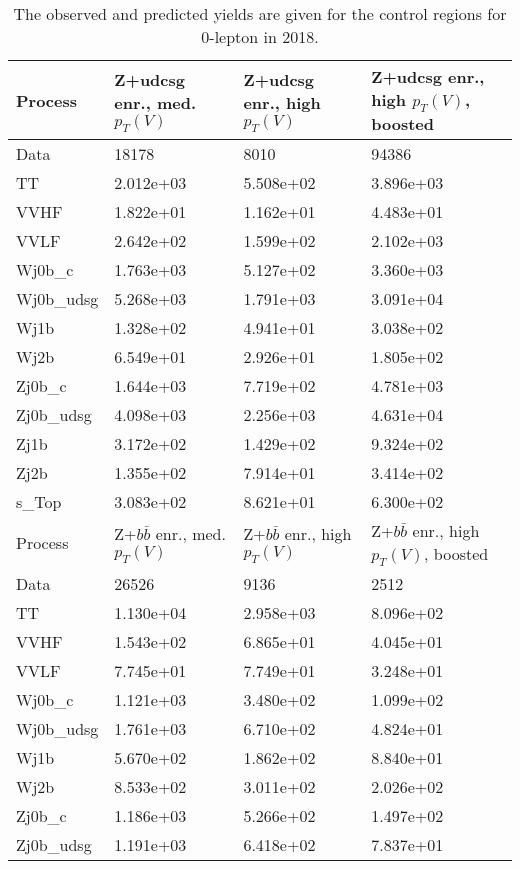 \begin{table}
\centering
\caption[2018 0-lepton control region yields]{
                  The observed and predicted yields are given for the
                  control regions for 0-lepton in 2018.
                  }
{\footnotesize
\begin{tabularx}{0.8\textwidth}{|X|X|X|X|}
\hline
Process & Z+udcsg enr., med. $p_{T}(V)$ & Z+udcsg enr., high $p_{T}(V)$ & Z+udcsg enr., high $p_{T}(V)$, boosted \\
\hline
Data & 18178 & 8010 & 94386 \\
\hline
TT & 2.012e+03 & 5.508e+02 & 3.896e+03 \\
VVHF & 1.822e+01 & 1.162e+01 & 4.483e+01 \\
VVLF & 2.642e+02 & 1.599e+02 & 2.102e+03 \\
Wj0b\_c & 1.763e+03 & 5.127e+02 & 3.360e+03 \\
Wj0b\_udsg & 5.268e+03 & 1.791e+03 & 3.091e+04 \\
Wj1b & 1.328e+02 & 4.941e+01 & 3.038e+02 \\
Wj2b & 6.549e+01 & 2.926e+01 & 1.805e+02 \\
Zj0b\_c & 1.644e+03 & 7.719e+02 & 4.781e+03 \\
Zj0b\_udsg & 4.098e+03 & 2.256e+03 & 4.631e+04 \\
Zj1b & 3.172e+02 & 1.429e+02 & 9.324e+02 \\
Zj2b & 1.355e+02 & 7.914e+01 & 3.414e+02 \\
s\_Top & 3.083e+02 & 8.621e+01 & 6.300e+02 \\
\hline
\hline
Process & Z+$b\bar{b}$ enr., med. $p_{T}(V)$ & Z+$b\bar{b}$ enr., high $p_{T}(V)$ & Z+$b\bar{b}$ enr., high $p_{T}(V)$, boosted \\
\hline
Data & 26526 & 9136 & 2512 \\
\hline
TT & 1.130e+04 & 2.958e+03 & 8.096e+02 \\
VVHF & 1.543e+02 & 6.865e+01 & 4.045e+01 \\
VVLF & 7.745e+01 & 7.749e+01 & 3.248e+01 \\
Wj0b\_c & 1.121e+03 & 3.480e+02 & 1.099e+02 \\
Wj0b\_udsg & 1.761e+03 & 6.710e+02 & 4.824e+01 \\
Wj1b & 5.670e+02 & 1.862e+02 & 8.840e+01 \\
Wj2b & 8.533e+02 & 3.011e+02 & 2.026e+02 \\
Zj0b\_c & 1.186e+03 & 5.266e+02 & 1.497e+02 \\
Zj0b\_udsg & 1.191e+03 & 6.418e+02 & 7.837e+01 \\

\end{tabularx}}
\end{table}

